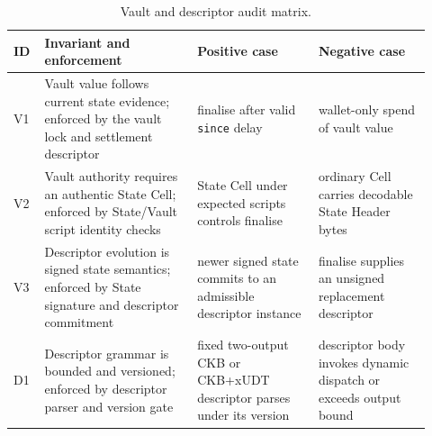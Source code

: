\documentclass[a4paper,11pt]{article}
\begin{document}
\begin{table}[H]
\centering
\footnotesize
\setlength{\tabcolsep}{4pt}
\begin{tabular}{L{0.06\linewidth}L{0.34\linewidth}L{0.27\linewidth}L{0.25\linewidth}}
\toprule
ID & Invariant and enforcement & Positive case & Negative case \\
\midrule
V1 & Vault value follows current state evidence; enforced by the vault lock and settlement descriptor & finalise after valid \texttt{since} delay & wallet-only spend of vault value \\
V2 & Vault authority requires an authentic State Cell; enforced by State/Vault script identity checks & State Cell under expected scripts controls finalise & ordinary Cell carries decodable State Header bytes \\
V3 & Descriptor evolution is signed state semantics; enforced by State signature and descriptor commitment & newer signed state commits to an admissible descriptor instance & finalise supplies an unsigned replacement descriptor \\
D1 & Descriptor grammar is bounded and versioned; enforced by descriptor parser and version gate & fixed two-output CKB or CKB+xUDT descriptor parses under its version & descriptor body invokes dynamic dispatch or exceeds output bound \\
\bottomrule
\end{tabular}
\caption{Vault and descriptor audit matrix.}
\label{tab:audit-vault-descriptor}
\end{table}
\end{document}
